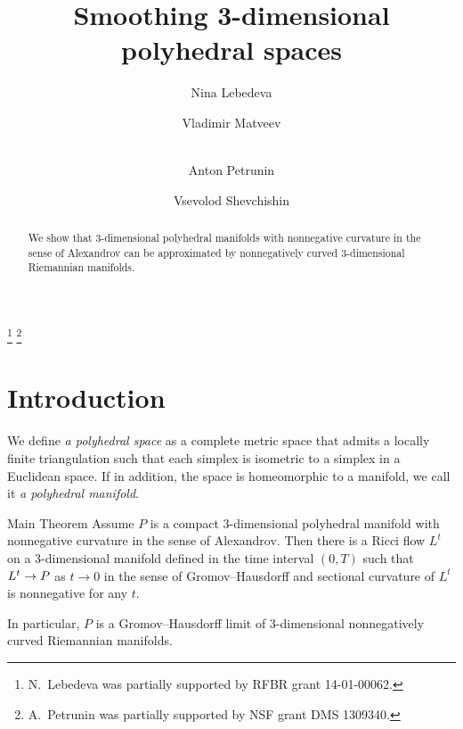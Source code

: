 \documentclass[a4paper,10pt]{amsart}
\begin{document}

\title{Smoothing 3-dimensional polyhedral spaces}

\author[Lebedeva]{Nina Lebedeva}
\address{N. Lebedeva\newline\vskip-4mm
Steklov Institute, St. Petersburg, Russia.
\newline\vskip-4mm
Mathematical Department of
St. Petersburg State University, Russia.}

\author[Matveev]{Vladimir Matveev}
\address{V. Matveev\newline\vskip-4mm
Institut f\"ur Mathematik, Friedrich-Schiller-Universit\"at Jena,  Germany.
}

\author[Petrunin]{\\Anton Petrunin}
\address{A. Petrunin\newline\vskip-4mm
Mathematical Department, Pennsylvania State University, USA}

\author[Shevchishin]{Vsevolod Shevchishin}
\address{V. Shevchishin\newline\vskip-4mm
National Research University, Higher School of Economics, Moscow, Russia.
}

\thanks{N.~Lebedeva was partially supported by RFBR grant 
14-01-00062.}
\thanks{A.~Petrunin was partially supported by NSF grant DMS 1309340.}
\date{}
\begin{abstract}
We show that 3-dimensional polyhedral manifolds 
with nonnegative curvature in the sense of Alexandrov
can be approximated by nonnegatively curved 3-dimensional Riemannian manifolds.
\end{abstract}
\maketitle

\section{Introduction}

We define \emph{a polyhedral space} as a complete metric space that admits a locally finite triangulation 
such that each simplex is isometric to a simplex in a Euclidean space.
If in addition, the space is homeomorphic to a manifold,
we call it \emph{a polyhedral manifold}.

\begin{thm}{Main Theorem}\label{thm:main}
Assume $P$ is a compact 3-dimensional polyhedral manifold with nonnegative curvature in the sense of Alexandrov.
Then there is a 
Ricci flow $L^t$ on a 3-dimensional manifold
defined in the time interval $(0,T)$
such that $L^t\z\to P$ as $t\to0$ in the sense of Gromov--Hausdorff
and sectional curvature of $L^t$ is nonnegative for any $t$.

In particular, $P$ is a Gromov--Hausdorff limit 
of 3-dimensional nonnegatively curved Riemannian manifolds. 
\end{thm}
\end{document}
